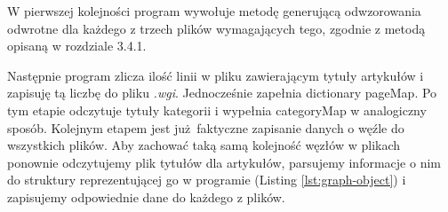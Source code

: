 W pierwszej kolejności program wywołuje metodę generującą odwzorowania odwrotne dla każdego z trzech plików wymagających tego, zgodnie z metodą opisaną w rozdziale 3.4.1.

Następnie program zlicza ilość linii w pliku zawierającym tytuły artykułów i zapisuję tą liczbę do pliku \textit{.wgi}. Jednocześnie zapełnia dictionary pageMap. Po tym etapie odczytuje tytuły kategorii i wypełnia categoryMap w analogiczny sposób.\newline
Kolejnym etapem jest już faktyczne zapisanie danych o węźle do wszystkich plików. Aby zachować taką samą kolejność węzłów w plikach ponownie odczytujemy plik tytułów dla artykułów, parsujemy informacje o nim do struktury reprezentującej go w programie (Listing \ref{lst:graph-object}) i zapisujemy odpowiednie dane do każdego z plików.
\newline
